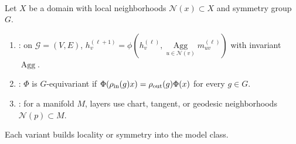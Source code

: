 \begin{remark} \label{rem:sl-geometric-deep-learning} \\
Let $X$ be a domain with local neighborhoods $\mathcal N(x)\subset X$ and symmetry group $G$.
\begin{enumerate}[label=(\roman*)]
\setlength{\itemsep}{0pt}
\item {}: on $\mathcal G=(V,E)$, $h_v^{(\ell+1)}=\phi(h_v^{(\ell)},\operatorname{Agg}\limits_{u\in\mathcal N(v)}m_{uv}^{(\ell)})$ with invariant $\operatorname{Agg}$.
\item {}: $\Phi$ is $G$-equivariant if $\Phi(\rho_{\rm in}(g)x)=\rho_{\rm out}(g)\Phi(x)$ for every $g\in G$.
\item {}: for a manifold $M$, layers use chart, tangent, or geodesic neighborhoods $\mathcal N(p)\subset M$.
\end{enumerate}
Each variant builds locality or symmetry into the model class.
\end{remark}

